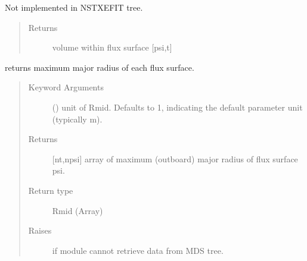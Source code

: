 \documentclass[letterpaper,10pt,english]{sphinxmanual}
\begin{document}
\begin{fulllineitems}
\begin{fulllineitems}
\label{\detokenize{eqtools:eqtools.NSTXEFIT.NSTXEFITTree.getFluxVol}}
Not implemented in NSTXEFIT tree.
\begin{quote}\begin{description}
\item[{Returns}] \leavevmode
volume within flux surface {[}psi,t{]}

\end{description}\end{quote}

\end{fulllineitems}


\begin{fulllineitems}
\label{\detokenize{eqtools:eqtools.NSTXEFIT.NSTXEFITTree.getRmidPsi}}
returns maximum major radius of each flux surface.
\begin{quote}\begin{description}
\item[{Keyword Arguments}] \leavevmode
{} () \textendash{} unit of Rmid.  Defaults to 1, indicating
the default parameter unit (typically m).

\item[{Returns}] \leavevmode
{[}nt,npsi{]} array of maximum (outboard) major radius of
flux surface psi.

\item[{Return type}] \leavevmode
Rmid (Array)

\item[{Raises}] \leavevmode
{} \textendash{} if module cannot retrieve data from MDS tree.

\end{description}\end{quote}

\end{fulllineitems}



\end{fulllineitems}
\end{document}
